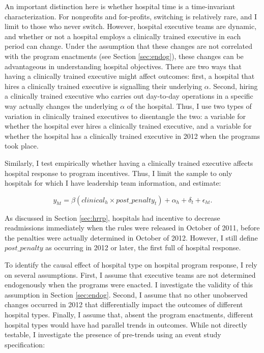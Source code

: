 \documentclass[12pt]{article}
\begin{document}
    An important distinction here is whether hospital time is a time-invariant characterization. For nonprofits and for-profits, switching is relatively rare, and I limit to those who never switch. However, hospital executive teams are dynamic, and whether or not a hospital employs a clinically trained executive in each period can change. Under the assumption that these changes are not correlated with the program enactments (see Section \ref{sec:endog}), these changes can be advantageous in understanding hospital objectives. There are two ways that having a clinically trained executive might affect outcomes: first, a hospital that hires a clinically trained executive is signalling their underlying $\alpha$. Second, hiring a clinically trained executive who carries out day-to-day operations in a specific way actually changes the underlying $\alpha$ of the hospital. Thus, I use two types of variation in clinically trained executives to disentangle the two: a variable for whether the hospital ever hires a clinically trained executive, and a variable for whether the hospital has a clinically trained executive in 2012 when the programs took place.  
    
    Similarly, I test empirically whether having a clinically trained executive affects hospital response to program incentives. Thus, I limit the sample to only hospitals for which I have leadership team information, and estimate:

    \begin{equation}
    \label{eq:clinical}
    y_{ht} = \beta (clinical_h \times post\_penalty_t) + \alpha_{h} + \delta_t + \epsilon_{ht}.
    \end{equation}
    
    As discussed in Section \ref{sec:hrrp}, hospitals had incentive to decrease readmissions immediately when the rules were released in October of 2011, before the penalties were actually determined in October of 2012. However, I still define $post\_penalty$ as occurring in 2012 or later, the first full of hospital response.

    To identify the causal effect of hospital type on hospital program response, I rely on several assumptions. First, I assume that executive teams are not determined endogenously when the programs were enacted. I investigate the validity of this assumption in Section \ref{sec:endog}. Second, I assume that no other unobserved changes occurred in 2012 that differentially impact the outcomes of different hospital types. Finally, I assume that, absent the program enactments, different hospital types would have had parallel trends in outcomes. While not directly testable, I investigate the presence of pre-trends using an event study specification:
\end{document}
